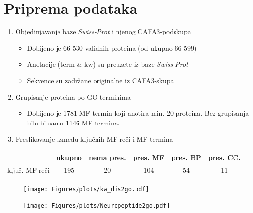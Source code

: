 \documentclass{beamer}
\newcommand{\swissprot}{\textit{Swiss-Prot} }
\begin{document}
\section{Priprema podataka}

\begin{frame}

  \begin{enumerate}
    \item Objedinjavanje baze \swissprot i njenog CAFA3-podskupa
      \begin{itemize}
        \item Dobijeno je 66 530 validnih proteina (od ukupno 66 599)
        \item Anotacije (term \& kw) su preuzete iz baze \swissprot
        \item Sekvence su zadržane originalne iz CAFA3-skupa
      \end{itemize}
    \item Grupisanje proteina po GO-terminima
      \begin{itemize}
        \item Dobijeno je 1781 MF-termin koji anotira min. 20 proteina.
              Bez grupisanja bilo bi samo 1146 MF-termina.
      \end{itemize}
    \item Preslikavanje između ključnih MF-reči i MF-termina


  \end{enumerate}

  \begin{table}
    \begin{tabular}{|r|c|c|c|c|c|}
      \hline
      & ukupno & nema pres. & pres. MF & pres. BP & pres. CC.      \\
      \hline
      ključ. MF-reči  & 195    &  20       &  104     & 54      & 11           \\
      \hline
    \end{tabular}
  \end{table}
  
\end{frame}

\begin{frame}
  \begin{figure}[!th]
    \centering
    \vspace*{-0.2cm} 
    \texttt{[image: Figures/plots/kw\_dis2go.pdf]}
  \end{figure}
\end{frame}

\begin{frame}
  \begin{figure}[!th]
    \centering
    \vspace*{-0.49cm} 
    \texttt{[image: Figures/plots/Neuropeptide2go.pdf]}
  \end{figure}
\end{frame}
\end{document}
